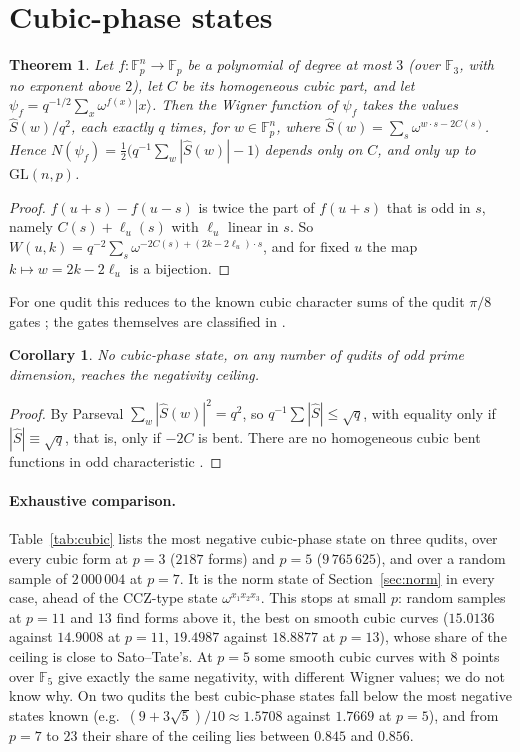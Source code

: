 \documentclass[11pt]{article}
\newtheorem{theorem}{Theorem}
\newtheorem{corollary}{Corollary}
\theoremstyle{remark}
\newcommand{\F}{\mathbb{F}}
\begin{document}
\section{Cubic-phase states}
\begin{theorem}\label{thm:walsh}
Let $f:\F_p^n\to\F_p$ be a polynomial of degree at most $3$ (over $\F_3$, with no exponent above $2$), let $C$ be its
homogeneous cubic part, and let $\psi_f=q^{-1/2}\sum_x\omega^{f(x)}|x\rangle$. Then the Wigner function of $\psi_f$
takes the values $\widehat S(w)/q^2$, each exactly $q$ times, for $w\in\F_p^n$, where
$\widehat S(w)=\sum_s\omega^{w\cdot s-2C(s)}$. Hence $N(\psi_f)=\tfrac12\big(q^{-1}\sum_w|\widehat S(w)|-1\big)$ depends
only on $C$, and only up to $\mathrm{GL}(n,p)$.
\end{theorem}
\begin{proof}
$f(u+s)-f(u-s)$ is twice the part of $f(u+s)$ that is odd in $s$, namely $C(s)+\ell_u(s)$ with $\ell_u$ linear in $s$.
So $W(u,k)=q^{-2}\sum_s\omega^{-2C(s)+(2k-2\ell_u)\cdot s}$, and for fixed $u$ the map $k\mapsto w=2k-2\ell_u$ is a
bijection.
\end{proof}
For one qudit this reduces to the known cubic character sums of the qudit $\pi/8$ gates \cite{HowardVala2012}; the
gates themselves are classified in \cite{CGK2017}.

\begin{corollary}\label{cor:ceiling}
No cubic-phase state, on any number of qudits of odd prime dimension, reaches the negativity ceiling.
\end{corollary}
\begin{proof}
By Parseval $\sum_w|\widehat S(w)|^2=q^2$, so $q^{-1}\sum|\widehat S|\le\sqrt q$, with equality only if
$|\widehat S|\equiv\sqrt q$, that is, only if $-2C$ is bent. There are no homogeneous cubic bent functions in odd
characteristic \cite{MOS2018}.
\end{proof}

\paragraph{Exhaustive comparison.} Table~\ref{tab:cubic} lists the most negative cubic-phase state on three qudits,
over every cubic form at $p=3$ ($2187$ forms) and $p=5$ ($9\,765\,625$), and over a random sample of $2\,000\,004$ at
$p=7$. It is the norm state of Section~\ref{sec:norm} in every case, ahead of the CCZ-type state $\omega^{x_1x_2x_3}$.
This stops at small $p$: random samples at $p=11$ and $13$ find forms above it, the best on smooth cubic curves
($15.0136$ against $14.9008$ at $p=11$, $19.4987$ against $18.8877$ at $p=13$), whose share of the ceiling is close
to Sato--Tate's.
At $p=5$ some smooth cubic curves with $8$ points over $\F_5$ give exactly the same negativity, with different Wigner
values; we do not know why. On two qudits the best cubic-phase states fall below the most negative states known
(e.g.\ $(9+3\sqrt5)/10\approx1.5708$ against $1.7669$ at $p=5$), and from $p=7$ to $23$ their share of the ceiling lies
between $0.845$ and $0.856$.
\end{document}
